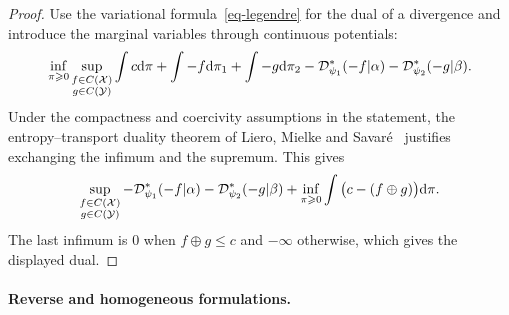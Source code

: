 \begin{proof}
	Use the variational formula~\eqref{eq-legendre} for the dual of a divergence and introduce the marginal variables through continuous potentials:
	\[
	\inf_{\pi\geqslant0}\sup_{\substack{f\in C(\mathcal{X})\\g\in C(\mathcal{Y})}}
	\int c\mathrm{d}\pi + \int -f\mathrm{d}\pi_1 + \int -g\mathrm{d}\pi_2
	-
	\mathcal{D}_{\psi_1}^*(-f|\alpha)
	-
	\mathcal{D}_{\psi_2}^*(-g|\beta).
	\]
	Under the compactness and coercivity assumptions in the statement, the
	entropy--transport duality theorem of Liero, Mielke and Savar\'e~\cite{LieroMielkeSavareLong}
	justifies exchanging the infimum and the supremum. This gives
	\[
	\sup_{\substack{f\in C(\mathcal{X})\\g\in C(\mathcal{Y})}}
	-
	\mathcal{D}_{\psi_1}^*(-f|\alpha)
	-
	\mathcal{D}_{\psi_2}^*(-g|\beta)
	+
	\inf_{\pi\geqslant0}\int\big(c-(f\oplus g)\big)\mathrm{d}\pi.
	\]
	The last infimum is $0$ when $f\oplus g\leq c$ and $-\infty$ otherwise, which gives the displayed dual.
\end{proof}

\paragraph{Reverse and homogeneous formulations.}

